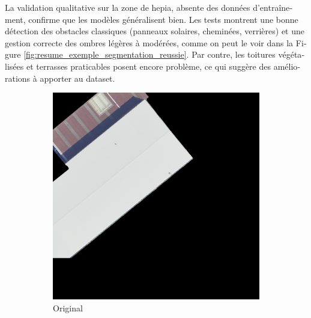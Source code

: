 \begin{otherlanguage}{french}
La validation qualitative sur la zone de \acrshort{hepia}, absente des données d'entraînement, confirme que les modèles généralisent bien. Les tests montrent une bonne détection des obstacles classiques (panneaux solaires, cheminées, verrières) et une gestion correcte des ombres légères à modérées, comme on peut le voir dans la Figure \ref{fig:resume_exemple_segmentation_reussie}. Par contre, les toitures végétalisées et terrasses praticables posent encore problème, ce qui suggère des améliorations à apporter au dataset.

\begin{figure}[htbp]
    \centering
    \begin{subfigure}{0.32\textwidth}
        \includegraphics[width=\textwidth]{02-main//figures/ch4/kfold_ensembles/linknet_timm-efficientnet-b5/best_cases/best_3_iou0.986_24931117_tile_18_5_f475a0_original.png}
        \caption{Original}
    \end{subfigure}
    \hfill
    \begin{subfigure}{0.32\textwidth}

\end{subfigure}
\end{figure}
\end{otherlanguage}
